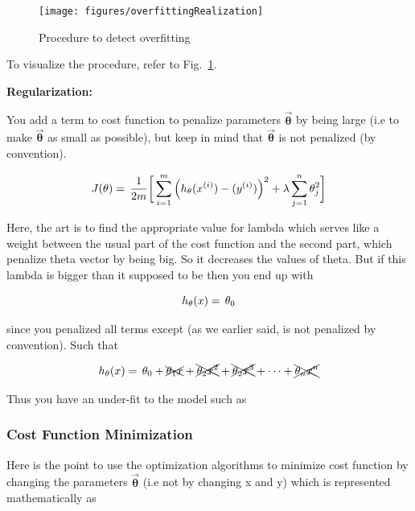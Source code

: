 \begin{figure}
\begin{center}
\texttt{[image: figures/overfittingRealization]}    %
\caption{Procedure to detect overfitting} 
\label{fig:overfittingRealization}
\end{center}
\end{figure}

To visualize the procedure, refer to  Fig.~\ref{fig:overfittingRealization}. 

\textbf{Regularization:}

You add a term to cost function to penalize parameters $\vec{\bm{\theta}}$
by being large (i.e to make $\vec{\bm{\theta}}$ as small as possible), 
but keep in mind that $\vec{\bm{\theta}}$ is not penalized (by convention).

\begin{equation}{\label{eqn:costFuncRegularized}}
J(\theta)
=\,
\frac{1}{2m} \bigg[ \sum\limits_{i=1}^{m} \Big(h_\theta(x^{(i)}) - (y^{(i)})\Big)^2 +\lambda \sum\limits_{j=1}^{n} \theta_j^2 \bigg] 
\end{equation} 

Here, the art is to find the appropriate value for lambda which serves 
like a weight between the usual part of the cost function and the second 
part, which penalize theta vector by being big. So it decreases the 
values of theta. But if this lambda is bigger than it supposed to be 
then you end up with 

\begin{equation}{\label{eqn:costFuncRegularizedTooMuch}}
h_\theta(x)
=\,
\theta_0 
\end{equation} 

since you penalized all terms except  (as we earlier said,  is not 
penalized by convention). Such that

\begin{equation}{\label{eqn:costFuncRegularizedTooMuchHow}}
h_\theta(x)
=\,
\theta_0 + \xcancel{\theta_1 x}  + \xcancel{\theta_2 x^2}  + \xcancel{\theta_2 x^3}  + \cdots + \xcancel{\theta_n x^n}
\end{equation} 

Thus you have an under-fit to the model such as

\subsubsection{Cost Function Minimization}

Here is the point to use the optimization algorithms to 
minimize cost function by changing the parameters $\vec{\bm{\theta}}$
(i.e not by changing x and y) which is represented mathematically as

